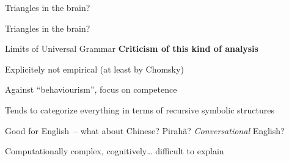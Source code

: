 \documentclass[aspectratio=169,cramped]{beamer}
\let\tempone\itemize
\let\temptwo\enditemize
\renewenvironment{itemize}{\tempone\addtolength{\itemsep}{-0\baselineskip}\addtolength{\parskip}{-0.2\baselineskip}}{\temptwo}
\begin{document}
\begin{frame}{Triangles in the brain?}
  \begin{figure}
    \centering
    \vspace{-2cm}
    \hspace{1cm}
  \end{figure}
\end{frame}

\begin{frame}{Triangles in the brain?}
  \begin{figure}
    \centering
    \vspace{-2cm}
    \hspace{1cm}
  \end{figure}
\end{frame}

\begin{frame}{Limits of Universal Grammar}
	\textbf{Criticism of this kind of analysis}
  \begin{itemize}
  \item Explicitely not empirical (at least by Chomsky)
    \begin{itemize}
    \item Against ``behaviourism'', focus on competence
    \item Tends to categorize everything in terms of recursive symbolic structures
    \item Good for English~-- what about Chinese? Pirah\~{a}? \textit{Conversational} English?
    \end{itemize}
  \item Computationally complex, cognitively\ldots{} difficult to explain
  \end{itemize}
\end{frame}
\end{document}
